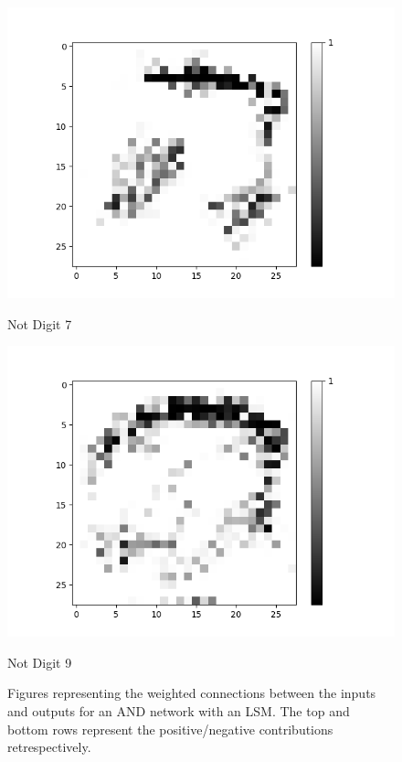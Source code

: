 \begin{figure}[H]
\begin{minipage}[b]{0.19\textwidth}
		\includegraphics[width=\textwidth]{AND(LSM)/Negative/Layer0-Neuron-7.png}
		\caption{Not Digit 7}
	\end{minipage}
	\begin{minipage}[b]{0.19\textwidth}
		\captionsetup{labelformat=empty}
		\includegraphics[width=\textwidth]{AND(LSM)/Negative/Layer0-Neuron-9.png}
		\caption{Not Digit 9}
	\end{minipage}
	\hfill
	\caption{Figures representing the weighted connections between the inputs and outputs for an AND network with an LSM. The top and bottom rows represent the positive/negative contributions retrespectively.}
	\label{fig:and-net-new-archetchure-with-lsm-interp}
\end{figure}

